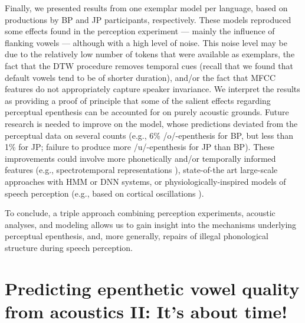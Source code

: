Finally, we presented results from one exemplar model per language, based on productions by BP and JP participants, respectively. These models reproduced some effects found in the perception experiment --- mainly the influence of flanking vowels --- although with a high level of noise. This noise level may be due to the relatively low number of tokens that were available as exemplars, the fact that the DTW procedure removes temporal cues (recall that we found that default vowels tend to be of shorter duration), and/or the fact that MFCC features do not appropriately capture speaker invariance.
We interpret the results as providing a proof of principle that some of the salient effects regarding perceptual epenthesis can be accounted for on purely acoustic grounds. Future research is needed to improve on the model, whose predictions deviated from the perceptual data on several counts (e.g., 6\% /o/-epenthesis for BP, but less than 1\% for JP; failure to produce more /u/-epenthesis for JP than BP). These improvements could involve more phonetically and/or temporally informed features (e.g., spectrotemporal representations \cite{chi2005}), state-of-the art large-scale approaches with HMM or DNN systems, or physiologically-inspired models of speech perception (e.g., based on cortical oscillations \cite{hyafil2015}). 

To conclude, a triple approach combining perception experiments, acoustic analyses, and modeling allows us to gain insight into the mechanisms underlying perceptual epenthesis, and, more generally, repairs of illegal phonological structure during speech perception.



\section{Predicting epenthetic vowel quality from acoustics II: It's about time!} \label{2-parlato-dur}

